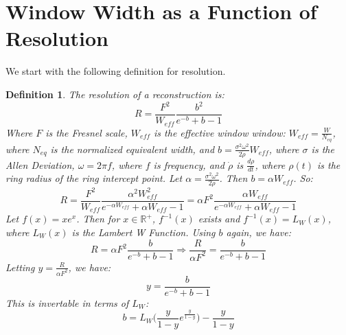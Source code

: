 \documentclass{article}
\theoremstyle{mystyle}
\newtheorem{definition}{Definition}[section]
\begin{document}
\section{Window Width as a Function of Resolution}
We start with the following definition for resolution.
\begin{definition}
The resolution of a reconstruction is:
\begin{equation*}
    R = \frac{F^2}{W_{eff}}\frac{b^2}{e^{-b}+b-1}
\end{equation*}
Where $F$ is the Fresnel scale, $W_{eff}$ is the effective window window: $W_{eff} = \frac{W}{N_{eq}}$, where $N_{eq}$ is the normalized equivalent width, and $b = \frac{\sigma^2 \omega^2}{2\dot{\rho}}W_{eff}$, where $\sigma$ is the Allen Deviation, $\omega = 2\pi f$, where $f$ is frequency, and $\dot{\rho}$ is $\frac{d\rho}{dt}$, where $\rho(t)$ is the ring radius of the ring intercept point. Let $\alpha = \frac{\sigma^2 \omega^2}{2\dot{\rho}}$. Then $b = \alpha W_{eff}$. So:
\begin{equation*}
R = \frac{F^2}{W_{eff}}\frac{\alpha^2 W_{eff}^2}{e^{-\alpha W_{eff}}+\alpha W_{eff}-1} = \alpha F^2 \frac{\alpha W_{eff}}{e^{-\alpha W_{eff}}+\alpha W_{eff} - 1}
\end{equation*}
Let $f(x) = xe^{x}$. Then for $x\in \mathbb{R}^{+}$, $f^{-1}(x)$ exists and $f^{-1}(x) = L_{W}(x)$, where $L_{W}(x)$ is the Lambert W Function. Using $b$ again, we have:
\begin{equation*}
    R = \alpha F^2 \frac{b}{e^{-b}+b-1}\Rightarrow \frac{R}{\alpha F^2} = \frac{b}{e^{-b}+b-1}
\end{equation*}
Letting $y = \frac{R}{\alpha F^2}$, we have:
\begin{equation*}
    y = \frac{b}{e^{-b}+b-1}
\end{equation*}
This is invertable in terms of $L_{W}$:
\begin{equation*}
    b = L_{W}\bigg(\frac{y}{1-y}e^{\frac{y}{1-y}}\bigg) - \frac{y}{1-y}
\end{equation*}
\end{definition}
\clearpage
\setlength\LTleft{0pt}
\setlength\LTright{0pt}
\setlength\glsdescwidth{0.8198\hsize}
\printglossary[type=\acronymtype, style=long]
\clearpage
\printglossary[style = long]
\end{document}
